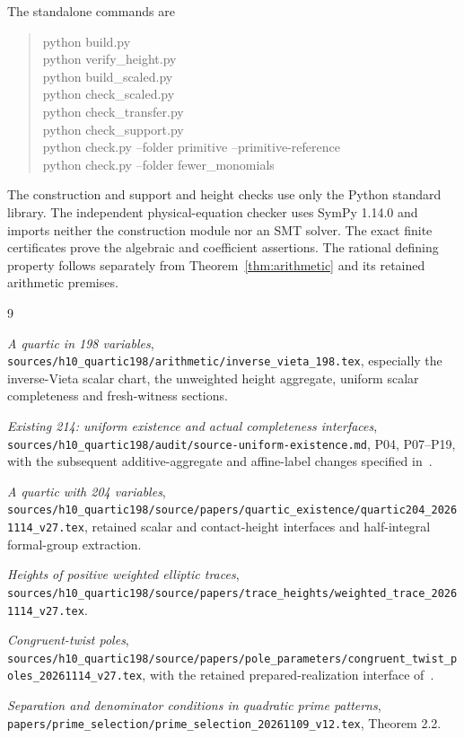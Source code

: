\documentclass[11pt,a4paper]{article}
\begin{document}
The standalone commands are
\begin{quote}\ttfamily\raggedright
python build.py\\
python verify\_height.py\\
python build\_scaled.py\\
python check\_scaled.py\\
python check\_transfer.py\\
python check\_support.py\\
python check.py --folder primitive --primitive-reference\\
python check.py --folder fewer\_monomials
\end{quote}
The construction and support and height checks use only the Python
standard library. The independent physical-equation checker uses
SymPy 1.14.0 and imports neither the construction module nor an SMT
solver. The exact finite certificates prove the algebraic and coefficient
assertions. The rational defining property follows separately from
Theorem~\ref{thm:arithmetic} and its retained arithmetic premises.

\begin{thebibliography}{9}\raggedright
{}
\emph{A quartic in 198 variables},
\nolinkurl{sources/h10_quartic198/arithmetic/inverse_vieta_198.tex},
especially the inverse-Vieta scalar chart, the unweighted height
aggregate, uniform scalar completeness and fresh-witness sections.

\emph{Existing 214: uniform existence and actual completeness interfaces},
\nolinkurl{sources/h10_quartic198/audit/source-uniform-existence.md},
P04, P07--P19, with the subsequent additive-aggregate and affine-label
changes specified in~\cite{InverseVieta,Quartic204}.

\emph{A quartic with 204 variables},
\nolinkurl{sources/h10_quartic198/source/papers/quartic_existence/quartic204_20261114_v27.tex},
retained scalar and contact-height interfaces and half-integral
formal-group extraction.

\emph{Heights of positive weighted elliptic traces},
\nolinkurl{sources/h10_quartic198/source/papers/trace_heights/weighted_trace_20261114_v27.tex}.

\emph{Congruent-twist poles},
\nolinkurl{sources/h10_quartic198/source/papers/pole_parameters/congruent_twist_poles_20261114_v27.tex},
with the retained prepared-realization interface of~\cite{Uniform}.

\emph{Separation and denominator conditions in quadratic prime patterns},
\nolinkurl{papers/prime_selection/prime_selection_20261109_v12.tex},
Theorem 2.2.
\end{thebibliography}
\end{document}
